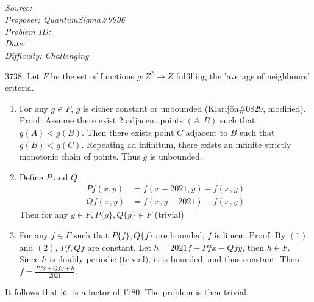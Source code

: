 
\SSbreak\\
\emph{Source: \Cop}\\
\emph{Proposer: QuantumSigma\#9996}\\
\emph{Problem ID: }\\
\emph{Date: }\\
\emph{Difficulty: Challenging}\\
\SSbreak

\bigskip

\begin{solution}\hfil\medskip
    $3738.$
Let $F$ be the set of functions $g: Z^2 \rightarrow Z$ fulfilling the 'average of neighbours' criteria.
\begin{enumerate}
    \item For any $g \in F$, $g$ is either constant or unbounded (Klarijōn\#0829, modified). Proof: Assume there exist 2 adjacent points $(A, B)$ such that $g(A) < g(B)$. Then there exists point $C$ adjacent to $B$ such that $g(B) < g(C)$. Repeating ad infinitum, there exists an infinite strictly monotonic chain of points. Thus $g$ is unbounded.
    \item Define $P$ and $Q$:
    \begin{align*}
        P{f}(x, y) &= f(x + 2021, y) - f(x, y)\\
        Q{f}(x, y) &= f(x, y + 2021) - f(x, y)
    \end{align*}
    Then for any $g \in F, P\{g\}, Q\{g\} \in F$ (trivial)
    \item For any $f \in F$ such that $P\{f\}, Q\{f\}$ are bounded, $f$ is linear. Proof: By $(1)$ and $(2)$, $P{f}, Q{f}$ are constant. Let $h = 2021f - P{f}x - Q{f}y$, then $h \in F$. Since $h$ is doubly periodic (trivial), it is bounded, and thus constant. Then $f = \frac{P{f}x + Q{f}y + h}{2021}$.
\end{enumerate}
It follows that $\left\lvert c\right\rvert$ is a factor of 1780.
The problem is then trivial.
\end{solution}\bigskip
